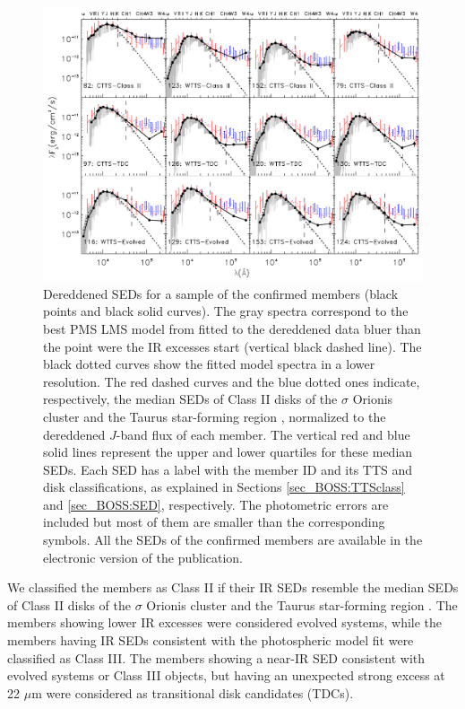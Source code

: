 \documentclass[12pt]{article}
\begin{document}
\begin{figure}[ht!]
	\centering
	\includegraphics[width=1.0\textwidth]{f8.pdf}
	\caption[SEDs of the confirmed members from the BOSS spectra]{Dereddened SEDs for a sample of the confirmed members (black points and black solid curves). The gray spectra correspond to the best PMS LMS model from \citet{Baraffe2015} fitted to the dereddened data bluer than the point were the IR excesses start (vertical black dashed line). The black dotted curves show the fitted \citet{Baraffe2015} model spectra in a lower resolution. The red dashed curves and the blue dotted ones indicate, respectively, the median SEDs of Class II disks of the $\sigma$ Orionis cluster \citep{Hernandez2007a} and the Taurus star-forming region \citep{Furlan2006}, normalized to the dereddened $J$-band flux of each member. The vertical red and blue solid lines represent the upper and lower quartiles for these median SEDs. Each SED has a label with the member ID and its TTS and disk classifications, as explained in Sections \ref{sec_BOSS:TTSclass} and \ref{sec_BOSS:SED}, respectively. The photometric errors are included but most of them are smaller than the corresponding symbols. All the SEDs of the confirmed members are available in the electronic version of the \citealt{Suarez2017} publication.}
	\label{fig_BOSS:SEDs}
\end{figure}

We classified the members as Class II if their IR SEDs resemble the median SEDs of Class II disks of the $\sigma$ Orionis cluster \citep{Hernandez2007a} and the Taurus star-forming region \citep{Furlan2006}. The members showing lower IR excesses were considered evolved systems, while the members having IR SEDs consistent with the photospheric \citet{Baraffe2015} model fit were classified as Class III. The members showing a near-IR SED consistent with evolved systems or Class III objects, but having an unexpected strong excess at 22 $\mu$m were considered as transitional disk candidates (\ac{TDC}s).
\end{document}
